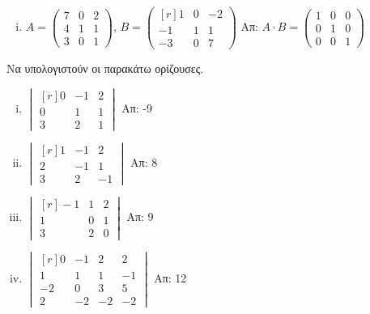 \documentclass[a4paper,table]{report}
\begin{document}
\begin{enumerate}
\begin{enumerate}[i)]
\item $A = \begin{pmatrix*}
        7 & 0 & 2 \\
        4 & 1 & 1 \\
        3 & 0 & 1 
    \end{pmatrix*}$, 
    \quad
    $ B = \begin{pmatrix*}[r]
        1 & 0 & -2 \\
        -1 & 1 & 1 \\
        -3 & 0 & 7
        \end{pmatrix*} $ \hfill Απ: $ A \cdot B = \begin{pmatrix}
        1 & 0 & 0 \\
        0 & 1 & 0 \\
        0 & 0 & 1
    \end{pmatrix} $ 

\end{enumerate}

Να υπολογιστούν οι παρακάτω ορίζουσες.

\begin{enumerate}[i),itemsep=10pt]
  \item $\begin{vmatrix*}[r]
            0 & -1 & 2 \\
            0 & 1 & 1 \\
            3 & 2 & 1
        \end{vmatrix*}$ 
        \hfill Απ: -9

      \item $\begin{vmatrix*}[r]
            1 & -1 & 2 \\
            2 & -1 & 1 \\
            3 & 2 & -1 
        \end{vmatrix*}$
        \hfill Απ: 8 

      \item $\begin{vmatrix*}[r]
            -1 & 1 & 2 \\
            1 & 0 & 1 \\
            3 & 2 & 0 
        \end{vmatrix*}$
    \hfill Απ: 9 

  \item $\begin{vmatrix*}[r]
        0 & -1 & 2 & 2 \\
        1 & 1 & 1 & -1 \\
        -2 & 0 & 3 & 5 \\
        2 & -2 & -2 & -2
    \end{vmatrix*}$
\hfill Απ: 12  

\end{enumerate}

\end{enumerate}
\end{document}
